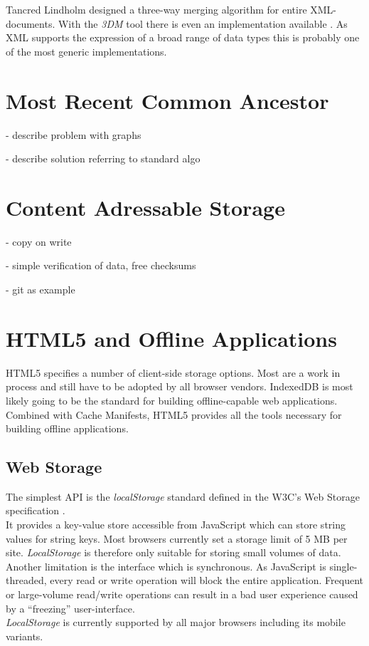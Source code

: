 Tancred Lindholm designed a three-way merging algorithm for entire XML-documents.
With the \emph{3DM} tool there is even an implementation available \cite{Lindholm:2001uv}.
As XML supports the expression of a broad range of data types this is probably one of the most generic implementations.

\section{Most Recent Common Ancestor}
- describe problem with graphs

- describe solution referring to standard algo

\section{Content Adressable Storage}
- copy on write

- simple verification of data, free checksums

- git as example

\section{HTML5 and Offline Applications}
HTML5 specifies a number of client-side storage options. Most are a work in process and still have to be adopted by all browser vendors. IndexedDB is most likely going to be the standard for building offline-capable web applications. Combined with Cache Manifests, HTML5 provides all the tools necessary for building offline applications.

\subsection{Web Storage}
The simplest API is the \emph{localStorage} standard defined in the W3C's Web Storage specification \cite{webstorage}.\\
It provides a key-value store accessible from JavaScript which can store string values for string keys.
Most browsers currently set a storage limit of 5 MB per site.
\emph{LocalStorage} is therefore only suitable for storing small volumes of data.\\
Another limitation is the interface which is synchronous. As JavaScript is single-threaded, every read or write operation will block the entire application.
Frequent or large-volume read/write operations can result in a bad user experience caused by a ``freezing'' user-interface.\\
\emph{LocalStorage} is currently supported by all major browsers including its mobile variants.

